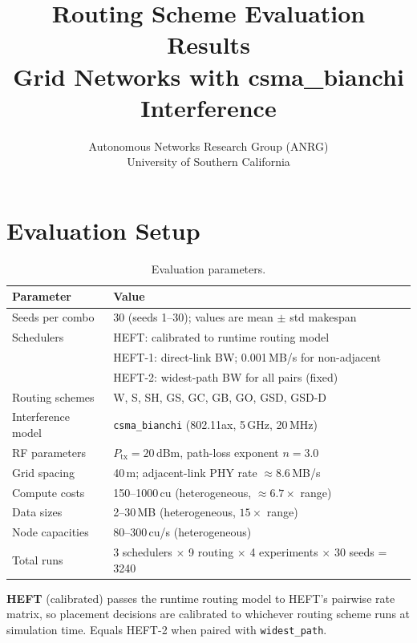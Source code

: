 \documentclass[11pt]{article}
\title{Routing Scheme Evaluation Results\\{\large Grid Networks with csma\_bianchi Interference}}
\author{Autonomous Networks Research Group (ANRG)\\University of Southern California}
\date{}
\begin{document}
\maketitle
\tableofcontents
\newpage


\section{Evaluation Setup}

\begin{table}[H]
\centering
\begin{tabular}{ll}
\toprule
\textbf{Parameter} & \textbf{Value} \\
\midrule
Seeds per combo        & 30 (seeds 1--30); values are mean $\pm$ std makespan \\
Schedulers             & HEFT: calibrated to runtime routing model \\
                       & HEFT-1: direct-link BW; 0.001\,MB/s for non-adjacent \\
                       & HEFT-2: widest-path BW for all pairs (fixed) \\
Routing schemes        & W, S, SH, GS, GC, GB, GO, GSD, GSD-D \\
Interference model     & \texttt{csma\_bianchi} (802.11ax, 5\,GHz, 20\,MHz) \\
RF parameters          & $P_\text{tx}=20$\,dBm, path-loss exponent $n=3.0$ \\
Grid spacing           & 40\,m; adjacent-link PHY rate $\approx8.6$\,MB/s \\
Compute costs          & 150--1000\,cu (heterogeneous, $\approx6.7\times$ range) \\
Data sizes             & 2--30\,MB (heterogeneous, $15\times$ range) \\
Node capacities        & 80--300\,cu/s (heterogeneous) \\
Total runs             & 3 schedulers $\times$ 9 routing $\times$ 4 experiments $\times$ 30 seeds = 3240 \\
\bottomrule
\end{tabular}
\caption{Evaluation parameters.}
\end{table}

\medskip\noindent
\textbf{HEFT} (calibrated) passes the runtime routing model to HEFT's pairwise
rate matrix, so placement decisions are calibrated to whichever routing scheme
runs at simulation time.  Equals HEFT-2 when paired with \texttt{widest\_path}.
\end{document}
